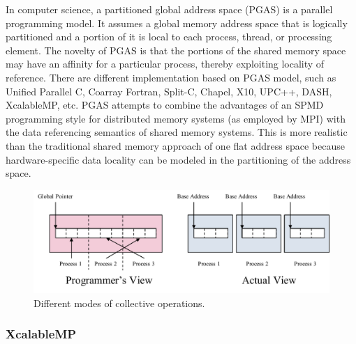 In computer science, a partitioned global address space (PGAS) is a parallel programming model. It assumes a global memory address space that is logically partitioned and a portion of it is local to each process, thread, or processing element. The novelty of PGAS is that the portions of the shared memory space may have an affinity for a particular process, thereby exploiting locality of reference. There are different implementation based on PGAS model, such as Unified Parallel C, Coarray Fortran, Split-C, Chapel, X10, UPC++, DASH, XcalableMP, etc. PGAS attempts to combine the advantages of an SPMD programming style for distributed memory systems (as employed by MPI) with the data referencing semantics of shared memory systems. This is more realistic than the traditional shared memory approach of one flat address space because hardware-specific data locality can be modeled in the partitioning of the address space.

\begin{figure}[htbp]
	\centering
	\includegraphics[width=6.3in]{fig/pgas.pdf}
	\caption{Different modes of collective operations.}
	\label{pgas}
\end{figure}

\subsubsection{XcalableMP}

